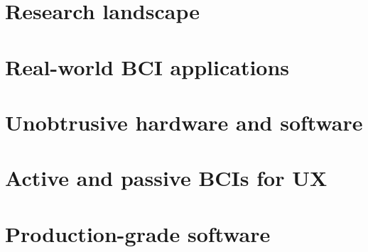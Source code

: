 \section{Research landscape}
\label{chapter2-research-landscape}


\section{Real-world BCI applications}
\label{chapter2-real-world-bci-applications}






\section{Unobtrusive hardware and software}
\label{chapter2-unobtrusive-hardware-and-software}


\section{Active and passive BCIs for UX}
\label{chapter2-active-and-passive-bcis-for-ux}


\section{Production-grade software}
\label{chapter2-production-grade-software}


